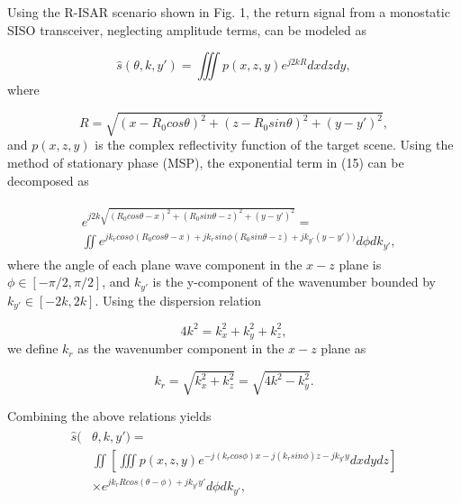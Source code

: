 \documentclass[conference]{IEEEtran}
\begin{document}
		Using the R-ISAR scenario shown in Fig. 1, the return signal from a monostatic SISO transceiver, neglecting amplitude terms, can be modeled as
		
		\begin{equation}
		\hat{s}(\theta,k,y') = \iiint p(x,z,y) e^{j2kR} dx dz dy,
		\end{equation}
		where
		
		\begin{equation}
		R = \sqrt{(x - R_0cos\theta)^2 +  (z - R_0sin\theta)^2 + (y - y')^2},
		\end{equation}
		and $p(x,z,y)$ is the complex reflectivity function of the target scene. Using the method of stationary phase (MSP), the exponential term in (15) can be decomposed as
		
		\begin{align}
		\begin{split}
		&e^{j2k\sqrt{(R_0cos\theta - x)^2 + (R_0sin\theta - z)^2 + (y - y')^2}} = \\ 
		&\iint e^{jk_rcos\phi(R_0cos\theta - x) + jk_rsin\phi(R_0sin\theta - z) + jk_{y'}(y-y'))} d\phi dk_{y'},
		\end{split}
		\label{}
		\end{align}
		where the angle of each plane wave component in the $x-z$ plane is $\phi \in [-\pi/2,\pi/2]$, and $k_{y'}$ is the y-component of the wavenumber bounded by $k_{y'} \in [-2k,2k]$. Using the dispersion relation
		
		\begin{equation}
		4k^2 = k_x^2 + k_y^2 + k_z^2,
		\end{equation}
		we define $k_r$ as the wavenumber component in the $x-z$ plane as
		
		\begin{equation}
		\label{Eq_stolt_1}
		k_r = \sqrt{k_x^2+k_z^2} = \sqrt{4k^2 - k_y^2}.
		\end{equation}
		
		Combining the above relations yields
		\begin{align}
		\begin{split}
		\hat{s}(&\theta,k,y') = \\
		& \iint \left[ \iiint p(x,z,y)e^{-j(k_rcos\phi)x-j(k_rsin\phi)z-jk_{y'}y}dxdydz \right] \\
		& \times e^{jk_rRcos(\theta-\phi) + jk_{y'}y'} d\phi dk_{y'},
		\end{split}
		\label{Eq_mimo_r_isar_signal_expanded}
		\end{align}
		
\end{document}

